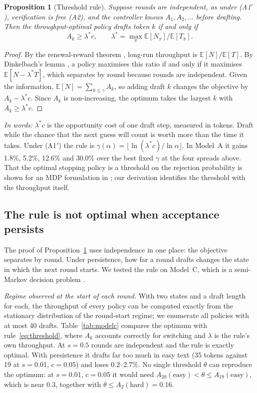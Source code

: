 \documentclass[10pt]{article}
\newtheorem{proposition}{Proposition}
\theoremstyle{remark}
\newcommand{\E}{\mathbb{E}}
\begin{document}
\begin{proposition}[Threshold rule]\label{prop:threshold}
Suppose rounds are independent, as under (A1$'$), verification is free (A2), and the controller knows $A_1,A_2,\dots$
before drafting. Then the throughput-optimal policy drafts token $k$ if and only if
\begin{equation}\label{eq:threshold}
A_k\ge\lambda^*c,\qquad \lambda^*=\max_\pi \E[N_\pi]/\E[T_\pi].
\end{equation}
\end{proposition}
\begin{proof}
By the renewal-reward theorem \cite{ross}, long-run throughput is $\E[N]/\E[T]$. By Dinkelbach's lemma
\cite{dinkelbach}, a policy maximises this ratio if and only if it maximises $\E[N-\lambda^*T]$, which separates by
round because rounds are independent. Given the information, $\E[N]=\sum_{k\le\gamma}A_k$, so adding draft $k$
changes the objective by $A_k-\lambda^*c$. Since $A_k$ is non-increasing, the optimum takes the largest $k$ with
$A_k\ge\lambda^*c$.
\end{proof}
\noindent\emph{In words:} $\lambda^*c$ is the opportunity cost of one draft step, measured in tokens. Draft while the
chance that the next guess will count is worth more than the time it takes. Under (A1$'$) the rule is
$\gamma(\alpha)=\lfloor\ln(\lambda^*c)/\ln\alpha\rfloor$. In Model~A it gains 1.8\%, 5.2\%, 12.6\% and 30.0\% over
the best fixed $\gamma$ at the four spreads above. That the optimal stopping policy is a threshold on the rejection
probability is shown for an MDP formulation in \cite{specdecpp}; our derivation identifies the threshold with the
throughput itself.

\subsection{The rule is not optimal when acceptance persists}\label{sec:markov}

The proof of Proposition~\ref{prop:threshold} uses independence in one place: the objective separates by round.
Under persistence, how far a round drafts changes the state in which the next round starts. We tested the rule on
Model~C, which is a semi-Markov decision problem \cite{puterman}.

\emph{Regime observed at the start of each round.} With two states and a draft length for each, the throughput of
every policy can be computed exactly from the stationary distribution of the round-start regime; we enumerate all
policies with at most 40 drafts. Table~\ref{tab:modelc} compares the optimum with rule~\eqref{eq:threshold}, where
$A_k$ accounts correctly for switching and $\lambda$ is the rule's own throughput. At $s=0.5$ rounds are independent
and the rule is exactly optimal. With persistence it drafts far too much in easy text (35 tokens against 19 at
$s=0.01$, $c=0.05$) and loses 0.2--2.7\%. No single threshold $\theta$ can reproduce the optimum: at $s=0.01$,
$c=0.05$ it would need $A_{20}(\text{easy})<\theta\le A_{19}(\text{easy})$, which is near $0.3$, together with
$\theta\le A_2(\text{hard})=0.16$.
\end{document}
